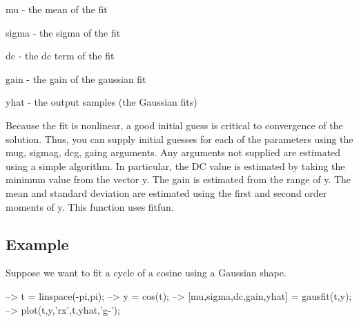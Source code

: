 \begin{DoxyItemize}
\item {\ttfamily mu} -\/ the mean of the fit  
\item {\ttfamily sigma} -\/ the sigma of the fit  
\item {\ttfamily dc} -\/ the dc term of the fit  
\item {\ttfamily gain} -\/ the gain of the gaussian fit  
\item {\ttfamily yhat} -\/ the output samples (the Gaussian fits)  
\end{DoxyItemize}Because the fit is nonlinear, a good initial guess is critical to convergence of the solution. Thus, you can supply initial guesses for each of the parameters using the {\ttfamily mug}, {\ttfamily sigmag}, {\ttfamily dcg}, {\ttfamily gaing} arguments. Any arguments not supplied are estimated using a simple algorithm. In particular, the D\-C value is estimated by taking the minimum value from the vector {\ttfamily y}. The gain is estimated from the range of {\ttfamily y}. The mean and standard deviation are estimated using the first and second order moments of {\ttfamily y}. This function uses {\ttfamily fitfun}. \hypertarget{variables_struct_Example}{}\subsection{Example}\label{variables_struct_Example}
Suppose we want to fit a cycle of a cosine using a Gaussian shape.


\begin{DoxyVerbInclude}
--> t = linspace(-pi,pi); 
--> y = cos(t);
--> [mu,sigma,dc,gain,yhat] = gausfit(t,y);
--> plot(t,y,'rx',t,yhat,'g-');
\end{DoxyVerbInclude}


